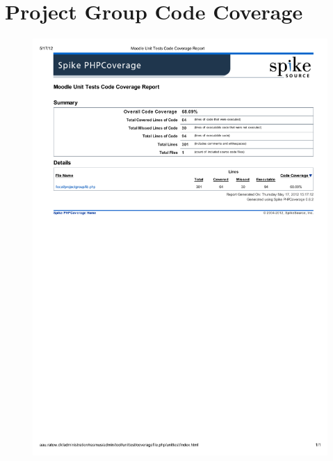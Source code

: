 \chapter{Project Group Code Coverage}
\label{app:localcc}
\begin{figure}
	\centering
		\includegraphics{images/localprojectgroupccreport.pdf}
	\label{fig:localprojectgroupccreport}
\end{figure}
